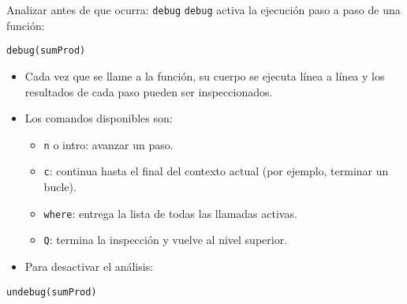 \documentclass[xcolor={usenames,svgnames,dvipsnames}]{beamer}
\begin{document}
\begin{frame}[label={sec:orgb2759af},fragile]{Analizar antes de que ocurra: \texttt{debug}}
 \texttt{debug} activa la ejecución paso a paso de una función:
\lstset{language=r,label= ,caption= ,captionpos=b,numbers=none}
\begin{lstlisting}
debug(sumProd)
\end{lstlisting}

\begin{itemize}
\item Cada vez que se llame a la función, su cuerpo se ejecuta línea a línea y los resultados de cada paso pueden ser inspeccionados.
\item Los comandos disponibles son:
\begin{itemize}
\item \texttt{n} o intro: avanzar un paso.
\item \texttt{c}: continua hasta el final del contexto actual (por ejemplo,
terminar un bucle).
\item \texttt{where}: entrega la lista de todas las llamadas activas.
\item \texttt{Q}: termina la inspección y vuelve al nivel superior.
\end{itemize}
\item Para desactivar el análisis:
\end{itemize}
\lstset{language=r,label= ,caption= ,captionpos=b,numbers=none}
\begin{lstlisting}
undebug(sumProd)
\end{lstlisting}
\end{frame}
\end{document}
